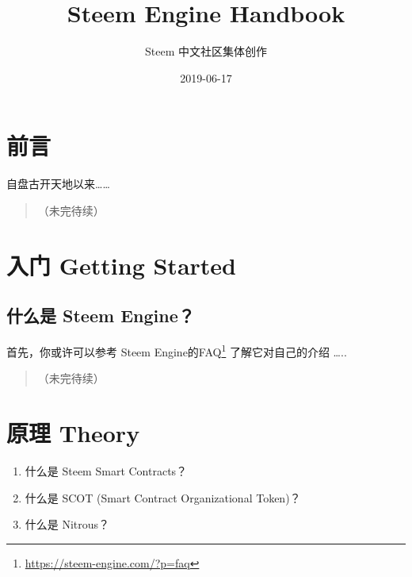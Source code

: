 \documentclass[]{ctexbook}
\title{Steem Engine Handbook}
\author{Steem 中文社区集体创作}
\date{2019-06-17}
\providecommand{\tightlist}{%
  \setlength{\itemsep}{0pt}\setlength{\parskip}{0pt}}
\renewcommand{\href}[2]{#2\footnote{\url{#1}}}
\begin{document}

\begin{titlepage}

\end{titlepage}

\setlength{\abovedisplayskip}{-5pt}
\setlength{\abovedisplayshortskip}{-5pt}

{
\setcounter{tocdepth}{1}
\tableofcontents
}


\hypertarget{index}{%
\chapter*{前言}\label{index}}

自盘古开天地以来\ldots{}\ldots{}

\begin{quote}
（未完待续）
\end{quote}

\mainmatter

\hypertarget{start}{%
\chapter{入门 Getting Started}\label{start}}

\hypertarget{-steem-engine}{%
\section{什么是 Steem Engine？}\label{-steem-engine}}

首先，你或许可以参考 \href{https://steem-engine.com/?p=faq}{Steem Engine的FAQ} 了解它对自己的介绍 \ldots{}..

\begin{quote}
（未完待续）
\end{quote}

\hypertarget{theory}{%
\chapter{原理 Theory}\label{theory}}

\begin{enumerate}
\def\labelenumi{\arabic{enumi}.}
\tightlist
\item
  什么是 Steem Smart Contracts？
\item
  什么是 SCOT (Smart Contract Organizational Token)？
\item
  什么是 Nitrous？
\end{enumerate}
\end{document}
